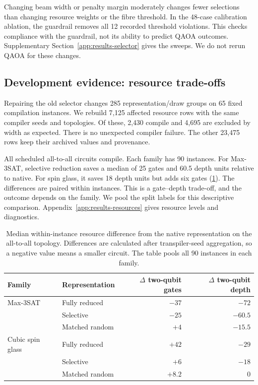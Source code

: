 \documentclass[a4paper,onecolumn,11pt,unpublished]{quantumarticle}
\theoremstyle{remark}
\begin{document}
Changing beam width or penalty margin moderately changes fewer selections
than changing resource weights or the fibre threshold.
In the 48-case calibration ablation, the guardrail removes all 12 recorded
threshold violations. This checks compliance with the guardrail, not its
ability to predict QAOA outcomes.
Supplementary Section~\ref{app:results-selector} gives the sweeps. We do not rerun QAOA for these changes.

\subsection{Development evidence: resource trade-offs}
\label{sec:results-resources}
\label{sec:results-regimes}

Repairing the old selector changes 285 representation/draw groups on
65 fixed compilation instances. We rebuild 7,125 affected resource rows
with the same compiler seeds and topologies. Of these, 2,430 compile and
4,695 are excluded by width as expected. There is no unexpected compiler
failure. The other 23,475 rows keep their archived values and provenance.

All scheduled all-to-all circuits compile. Each family has 90 instances.
For Max-3SAT, selective reduction saves a median of 25 gates and 60.5 depth
units relative to native. For spin glass, it saves 18 depth units but adds
six gates (\cref{tab:e2-all-to-all-paired}). The differences are paired
within instances. This is a gate--depth trade-off, and the outcome depends
on the family.
We pool the split labels for this descriptive comparison.
Appendix~\ref{app:results-resources} gives resource levels and diagnostics.

\begin{table}[!htbp]
    \centering
    \small
    \caption{Median within-instance resource difference from the native
    representation on the all-to-all topology.  Differences are calculated
    after transpiler-seed aggregation, so a negative value means a smaller
    circuit.  The table pools all 90 instances in each family.}
    \label{tab:e2-all-to-all-paired}
    \begin{tabular}{@{}llrr@{}}
        \toprule
        Family & Representation
        & $\Delta$ two-qubit gates & $\Delta$ two-qubit depth\\
        \midrule
        Max-3SAT & Fully reduced  & $-37$ & $-72$\\
                 & Selective      & $-25$ & $-60.5$\\
                 & Matched random & $+4$  & $-15.5$\\
        \addlinespace
        Cubic spin glass & Fully reduced  & $+42$ & $-29$\\
                         & Selective      & $+6$  & $-18$\\
                         & Matched random & $+8.2$ & $0$\\
        \bottomrule
    \end{tabular}
\end{table}
\end{document}
